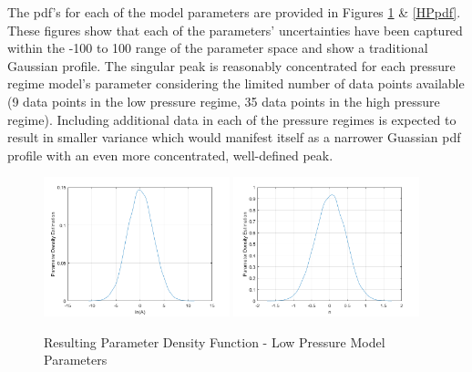\documentclass{article}
\begin{document}
The pdf's for each of the model parameters are provided in Figures \ref{LPpdf} \& \ref{HPpdf}. These figures show that each of 
the parameters' uncertainties have been captured within the -100 to 100 range of the parameter space and show 
a traditional Gaussian profile. The singular peak is reasonably concentrated for each pressure regime model's 
parameter considering the limited number of data points available (9 data points in the low pressure regime, 
35 data points in the high pressure regime). Including additional data in each of the pressure regimes
is expected to result in smaller variance which would manifest itself as a narrower Guassian pdf profile with an even
more concentrated, well-defined peak.

\begin{figure}[htb]
\centering
\includegraphics[width=0.48\textwidth]{PDF_lnA_LP.png}
\includegraphics[width=0.48\textwidth]{PDF_n_LP.png}
\caption{Resulting Parameter Density Function - Low Pressure Model Parameters}
\label{LPpdf}
\end{figure}
\end{document}
